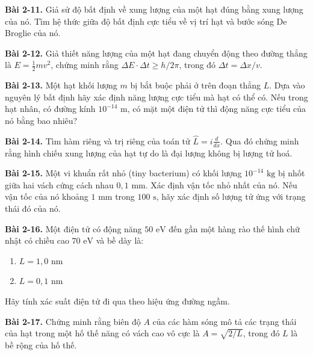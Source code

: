 \expandafter\def\csname debai@2-11\endcsname{
\textbf{Bài 2-11.} Giả sử độ bất định về xung lượng của một hạt đúng bằng xung lượng của nó. Tìm hệ thức giữa độ bất định cực tiểu về vị trí hạt và bước sóng De Broglie của nó.
}

\expandafter\def\csname debai@2-12\endcsname{
\textbf{Bài 2-12.} Giả thiết năng lượng của một hạt đang chuyển động theo đường thẳng là $E = \frac{1}{2}mv^2$, chứng minh rằng $\Delta E \cdot \Delta t \ge h/2\pi$, trong đó $\Delta t = \Delta x / v$.
}

\expandafter\def\csname debai@2-13\endcsname{
\textbf{Bài 2-13.} Một hạt khối lượng $m$ bị bắt buộc phải ở trên đoạn thẳng $L$. Dựa vào nguyên lý bất định hãy xác định năng lượng cực tiểu mà hạt có thể có. Nếu trong hạt nhân, có đường kính $10^{-14}\text{ m}$, có mặt một điện tử thì động năng cực tiểu của nó bằng bao nhiêu?
}

\expandafter\def\csname debai@2-14\endcsname{
\textbf{Bài 2-14.} Tìm hàm riêng và trị riêng của toán tử $\hat{L} = i \frac{d}{dx}$. Qua đó chứng minh rằng hình chiếu xung lượng của hạt tự do là đại lượng không bị lượng tử hoá.
}

\expandafter\def\csname debai@2-15\endcsname{
\textbf{Bài 2-15.} Một vi khuẩn rất nhỏ (tiny bacterium) có khối lượng $10^{-14}\text{ kg}$ bị nhốt giữa hai vách cứng cách nhau $0{,}1\text{ mm}$. Xác định vận tốc nhỏ nhất của nó. Nếu vận tốc của nó khoảng $1\text{ mm}$ trong $100\text{ s}$, hãy xác định số lượng tử ứng với trạng thái đó của nó.
}

\expandafter\def\csname debai@2-16\endcsname{
\textbf{Bài 2-16.} Một điện tử có động năng $50\text{ eV}$ đến gần một hàng rào thế hình chữ nhật có chiều cao $70\text{ eV}$ và bề dày là:
\begin{enumerate}[label=\alph*)]
  \item $L = 1{,}0\text{ nm}$
  \item $L = 0{,}1\text{ nm}$
\end{enumerate}
Hãy tính xác suất điện tử đi qua theo hiệu ứng đường ngầm.
}

\expandafter\def\csname debai@2-17\endcsname{
\textbf{Bài 2-17.} Chứng minh rằng biên độ $A$ của các hàm sóng mô tả các trạng thái của hạt trong một hố thế năng có vách cao vô cực là $A = \sqrt{2/L}$, trong đó $L$ là bề rộng của hố thế.
}

